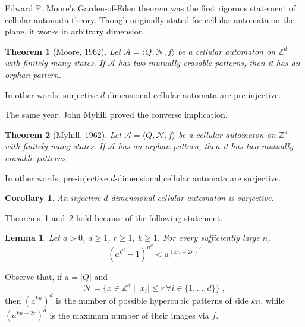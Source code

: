\documentclass[12pt]{article}
\begin{document}
\newcommand{\Acal}{\ensuremath{\mathcal{A}}}
\newcommand{\Neigh}{\ensuremath{\mathcal{N}}}
\newcommand{\restrict}[2]{\ensuremath{\left.{#1}\right|_{#2}}}
\newcommand{\Zset}{\ensuremath{\mathbb{Z}}}

\newtheorem{corollary}{Corollary}
\newtheorem{lemma}{Lemma}
\newtheorem{theorem}{Theorem}

\usepackage{hyperref}

Edward F. Moore's Garden-of-Eden theorem
was the first rigorous statement of cellular automata theory.
Though originally stated for cellular automata on the plane,
it works in arbitrary dimension.
\begin{theorem}[Moore, 1962] \label{thm:mo}
Let
\begin{math}
\Acal = \langle Q, \Neigh, f \rangle
\end{math}
be a cellular automaton on $\Zset^d$ with finitely many states.
If $\Acal$ has two mutually erasable patterns,
then it has an orphan pattern.
\end{theorem}
In other words,
surjective $d$-dimensional cellular automata are pre-injective.

The same year, John Myhill proved the converse implication.
\begin{theorem}[Myhill, 1962] \label{thm:my}
Let
\begin{math}
\Acal = \langle Q, \Neigh, f \rangle
\end{math}
be a cellular automaton on $\Zset^d$ with finitely many states.
If $\Acal$ has an orphan pattern,
then it has two mutually erasable patterns.
\end{theorem}
In other words,
pre-injective $d$-dimensional cellular automata are surjective.

\begin{corollary}
An injective $d$-dimensional cellular automaton is surjective.
\end{corollary}

Theorems~\ref{thm:mo} and~\ref{thm:my} hold because of the following statement.
\begin{lemma} \label{lem:mo}
Let $a > 0$, $d \geq 1$, $r \geq 1$, $k \geq 1$.
For every sufficiently large $n$,
\begin{equation} \label{eq:mo}
(a^{k^d}-1)^{n^d} < a^{(kn-2r)^d}
\end{equation}
\end{lemma}
Observe that,
if $a = |Q|$ and
\begin{equation} \label{eq:Dr}
\Neigh
= \{ x \in \Zset^d \mid |x_i| \leq r \, \forall i \in \{1,\ldots,d\} \}
\;,
\end{equation}
then $(a^{kn})^d$
is the number of possible hypercubic patterns of side $kn$,
while $(a^{kn-2r})^d$
is the maximum number of their images via $f$.
\end{document}
